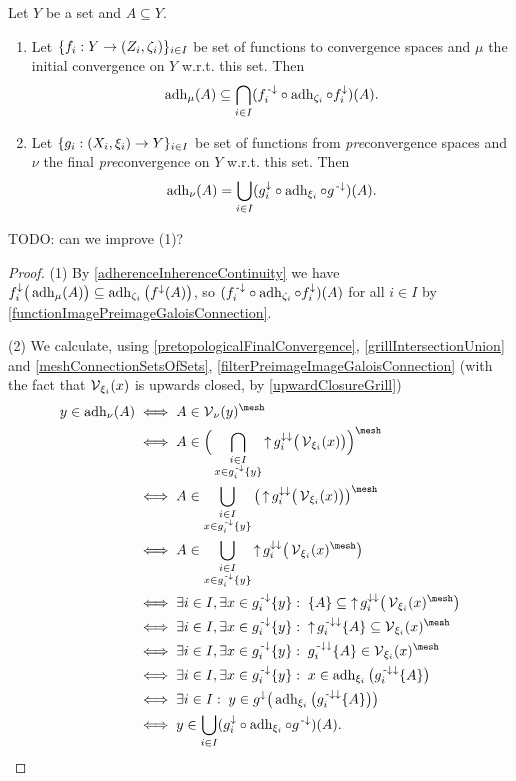 \begin{proposition} \label{adherenceInitialFinalConvergence}
Let $Y$ be a set and $A\subseteq Y$.
\begin{enumerate}
\item Let $\{f_i: Y\to \left( Z_i, \zeta_i \right)\}_{i\in I}$ be set of functions to convergence spaces and $\mu$ the initial convergence on $Y$ w.r.t. this set. Then
\[ \operatorname{adh}_\mu(A) \subseteq \bigcap_{i\in I}(f^{{\text{\hspace{0.15em}-}\downarrow}}_i\circ \operatorname{adh}_{\zeta_i}\circ f^{\downarrow}_i)(A). \]
\item Let $\{g_i: \left( X_i, \xi_i \right) \to Y\}_{i\in I}$ be set of functions from \emph{pre}convergence spaces and $\nu$ the final \emph{pre}convergence on $Y$ w.r.t. this set. Then
\[ \operatorname{adh}_\nu(A) = \bigcup_{i\in I}(g_i^{\downarrow}\circ\operatorname{adh}_{\xi_i}\circ g^{{\text{\hspace{0.15em}-}\downarrow}})(A). \]
\end{enumerate}
\end{proposition}
TODO: can we improve (1)?
\begin{proof}
(1) By \ref{adherenceInherenceContinuity} we have $f_i^{\downarrow}\big(\operatorname{adh}_\mu(A)\big) \subseteq \operatorname{adh}_{\zeta_i}\big(f^{\downarrow}(A)\big)$, so $(f^{{\text{\hspace{0.15em}-}\downarrow}}_i\circ \operatorname{adh}_{\zeta_i}\circ f^{\downarrow}_i)(A)$ for all $i\in I$ by \ref{functionImagePreimageGaloisConnection}.

(2) We calculate, using \ref{pretopologicalFinalConvergence}, \ref{grillIntersectionUnion} and \ref{meshConnectionSetsOfSets}, \ref{filterPreimageImageGaloisConnection} (with the fact that $\operatorname{\mathcal{V}}_{\xi_i}(x)$ is upwards closed, by \ref{upwardClosureGrill})
\begin{align*}
y\in \adh_\nu(A) &\iff A\in \vicinity_\nu(y)^\mesh \\
&\iff A\in \Big(\bigcap_{\substack{i\in I \\ x\in g^\preimf_i\{y\}}}\upset g_i^{\imf\imf}\big(\vicinity_{\xi_i}(x)\big)\Big)^\mesh \\
&\iff A\in \bigcup_{\substack{i\in I \\ x\in g^\preimf_i\{y\}}}\big(\upset g_i^{\imf\imf}\big(\vicinity_{\xi_i}(x)\big)\big)^\mesh \\
&\iff A\in \bigcup_{\substack{i\in I \\ x\in g^\preimf_i\{y\}}}\upset g_i^{\imf\imf}\big(\vicinity_{\xi_i}(x)^\mesh\big) \\
&\iff \exists i\in I, \exists x\in g^\preimf_i\{y\}: \;  \{A\}\subseteq \upset g_i^{\imf\imf}\big(\vicinity_{\xi_i}(x)^\mesh\big) \\
&\iff \exists i\in I, \exists x\in g^\preimf_i\{y\}: \;  \upset g_i^{\preimf\imf}\{A\}\subseteq \vicinity_{\xi_i}(x)^\mesh \\
&\iff \exists i\in I, \exists x\in g^\preimf_i\{y\}: \;  g_i^{\preimf\imf}\{A\}\in \vicinity_{\xi_i}(x)^\mesh \\
&\iff \exists i\in I, \exists x\in g^\preimf_i\{y\}: \;  x\in \adh_{\xi_i}\big(g_i^{\preimf\imf}\{A\}\big) \\
&\iff \exists i\in I: \;  y\in g^{\imf}\big(\adh_{\xi_i}\big(g_i^{\preimf\imf}\{A\}\big)\big) \\
&\iff y\in \bigcup_{i\in I}(g_i^{\imf}\circ\adh_{\xi_i}\circ g^{\preimf})(A).
\end{align*}
\end{proof}




